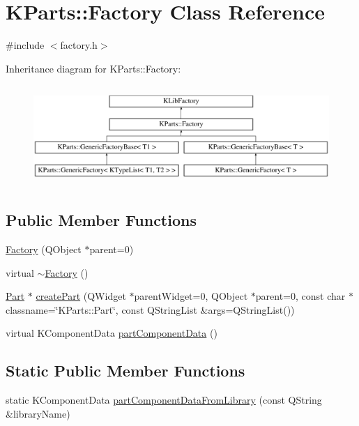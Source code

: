 \hypertarget{classKParts_1_1Factory}{\section{K\+Parts\+:\+:Factory Class Reference}
\label{classKParts_1_1Factory}
}


{\ttfamily \#include $<$factory.\+h$>$}

Inheritance diagram for K\+Parts\+:\+:Factory\+:\begin{figure}[H]
\begin{center}
\leavevmode
\includegraphics[height=3.835616cm]{classKParts_1_1Factory}
\end{center}
\end{figure}
\subsection*{Public Member Functions}
\begin{DoxyCompactItemize}
\item 
\hyperlink{classKParts_1_1Factory_aa5b7628de21a0b8b32dcd5bd3b3fe3af}{Factory} (Q\+Object $\ast$parent=0)
\item 
virtual \hyperlink{classKParts_1_1Factory_a051bbca3a6feb3a865f7e119112ff813}{$\sim$\+Factory} ()
\item 
\hyperlink{classKParts_1_1Part}{Part} $\ast$ \hyperlink{classKParts_1_1Factory_a41e7c93ddb621d17b7f380a9455ba2a8}{create\+Part} (Q\+Widget $\ast$parent\+Widget=0, Q\+Object $\ast$parent=0, const char $\ast$classname=\char`\"{}K\+Parts\+::\+Part\char`\"{}, const Q\+String\+List \&args=Q\+String\+List())
\item 
virtual K\+Component\+Data \hyperlink{classKParts_1_1Factory_a94c5c244737f0aa7788a1c114bc2acb9}{part\+Component\+Data} ()
\end{DoxyCompactItemize}
\subsection*{Static Public Member Functions}
\begin{DoxyCompactItemize}
\item 
static K\+Component\+Data \hyperlink{classKParts_1_1Factory_a5333c938faf8ecd06a172edb4af5692a}{part\+Component\+Data\+From\+Library} (const Q\+String \&library\+Name)
\end{DoxyCompactItemize}
